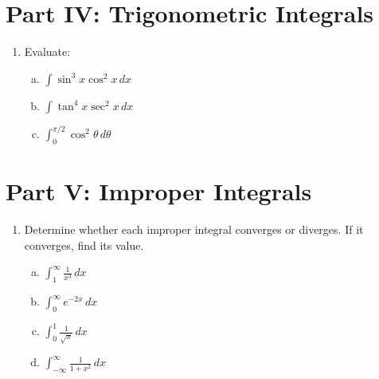 \documentclass[11pt]{article}
\begin{document}
\section*{Part IV: Trigonometric Integrals}

\begin{enumerate}[resume]
\item Evaluate:
\begin{enumerate}[(a)]
  \item $\displaystyle \int \sin^3 x \cos^2 x \, dx$

  \item $\displaystyle \int \tan^4 x \sec^2 x \, dx$

  \item $\displaystyle \int_0^{\pi/2} \cos^2 \theta \, d\theta$
\end{enumerate}
\end{enumerate}

\section*{Part V: Improper Integrals}

\begin{enumerate}[resume]
\item Determine whether each improper integral converges or diverges. If it converges, find its value.
\begin{enumerate}[(a)]
  \item $\displaystyle \int_1^{\infty} \frac{1}{x^3} \, dx$

  \item $\displaystyle \int_0^{\infty} e^{-2x} \, dx$

  \item $\displaystyle \int_0^{1} \frac{1}{\sqrt{x}} \, dx$

  \item $\displaystyle \int_{-\infty}^{\infty} \frac{1}{1 + x^2} \, dx$
\end{enumerate}
\end{enumerate}
\end{document}
